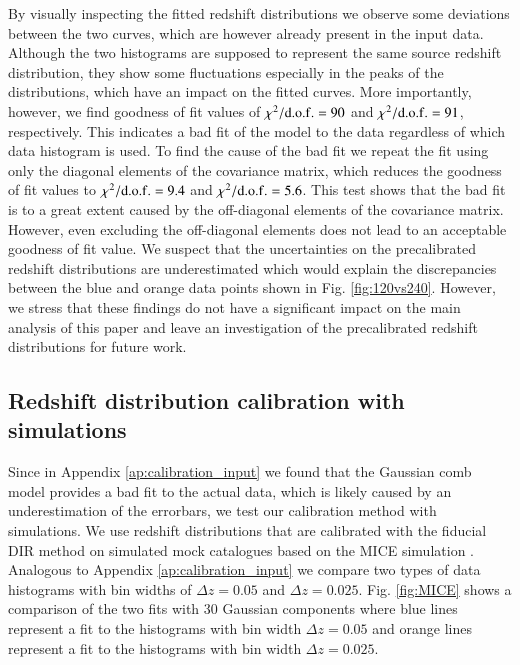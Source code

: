 \documentclass{aa}
\begin{document}
\begin{appendix}
By visually inspecting the fitted redshift distributions we observe some deviations between the two curves, which are however already present in the input data. Although the two histograms are supposed to represent the same source redshift distribution, they show some fluctuations especially in the peaks of the distributions, which have an impact on the fitted curves. More importantly, however, we find goodness of fit values of $\chi^2/{\rm d.o.f.} = 90$ and $\chi^2/{\rm d.o.f.} = 91$, respectively. This indicates a bad fit of the model to the data regardless of which data histogram is used. To find the cause of the bad fit we repeat the fit using only the diagonal elements of the covariance matrix, which reduces the goodness of fit values to $\chi^2/{\rm d.o.f.} = 9.4$ and $\chi^2/{\rm d.o.f.} = 5.6$. This test shows that the bad fit is to a great extent caused by the off-diagonal elements of the covariance matrix. However, even excluding the off-diagonal elements does not lead to an acceptable goodness of fit value. We suspect that the uncertainties on the precalibrated redshift distributions are underestimated which would explain the discrepancies between the blue and orange data points shown in Fig. \ref{fig:120vs240}. However, we stress that these findings do not have a significant impact on the main analysis of this paper and leave an investigation of the precalibrated redshift distributions for future work.
\subsection{Redshift distribution calibration with simulations}
\label{sec:MICE}
Since in Appendix \ref{ap:calibration_input} we found that the Gaussian comb model provides a bad fit to the actual data, which is likely caused by an underestimation of the errorbars, we test our calibration method with simulations. We use redshift distributions that are calibrated with the fiducial DIR method on simulated mock catalogues \citep{vdBusch20} based on the MICE simulation \citep{Mice1, Mice2, Mice3, carretero, hoffmann}. Analogous to Appendix \ref{ap:calibration_input} we compare two types of data histograms with bin widths of $\Delta z = 0.05$ and $\Delta z = 0.025$. Fig. \ref{fig:MICE} shows a comparison of the two fits with 30 Gaussian components where blue lines represent a fit to the histograms with bin width $\Delta z = 0.05$ and orange lines represent a fit to the histograms with bin width $\Delta z = 0.025$. 


\end{appendix}
\end{document}
